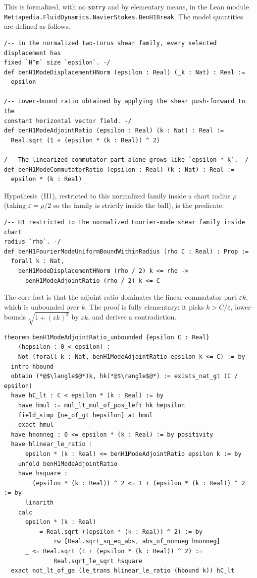 \documentclass[11pt]{article}
\theoremstyle{definition}
\begin{document}
This is formalized, with no \texttt{sorry} and by elementary means, in the Lean
module \texttt{Mettapedia.FluidDynamics.NavierStokes.BenH1Break}. The model
quantities are defined as follows.

\begin{lstlisting}[language={}]
/-- In the normalized two-torus shear family, every selected displacement has
fixed `H^m` size `epsilon`. -/
def benH1ModeDisplacementHNorm (epsilon : Real) (_k : Nat) : Real :=
  epsilon

/-- Lower-bound ratio obtained by applying the shear push-forward to the
constant horizontal vector field. -/
def benH1ModeAdjointRatio (epsilon : Real) (k : Nat) : Real :=
  Real.sqrt (1 + (epsilon * (k : Real)) ^ 2)

/-- The linearized commutator part alone grows like `epsilon * k`. -/
def benH1ModeCommutatorRatio (epsilon : Real) (k : Nat) : Real :=
  epsilon * (k : Real)
\end{lstlisting}

Hypothesis~(H1), restricted to this normalized family inside a chart radius
$\rho$ (taking $\varepsilon=\rho/2$ so the family is strictly inside the ball),
is the predicate:

\begin{lstlisting}[language={}]
/-- H1 restricted to the normalized Fourier-mode shear family inside chart
radius `rho`. -/
def benH1FourierModeUniformBoundWithinRadius (rho C : Real) : Prop :=
  forall k : Nat,
    benH1ModeDisplacementHNorm (rho / 2) k <= rho ->
      benH1ModeAdjointRatio (rho / 2) k <= C
\end{lstlisting}

The core fact is that the adjoint ratio dominates the linear commutator part
$\varepsilon k$, which is unbounded over $k$. The proof is fully elementary: it
picks $k>C/\varepsilon$, lower-bounds $\sqrt{1+(\varepsilon k)^2}$ by
$\varepsilon k$, and derives a contradiction.

\begin{lstlisting}[language={}]
theorem benH1ModeAdjointRatio_unbounded {epsilon C : Real}
    (hepsilon : 0 < epsilon) :
    Not (forall k : Nat, benH1ModeAdjointRatio epsilon k <= C) := by
  intro hbound
  obtain (*@$\langle$@*)k, hk(*@$\rangle$@*) := exists_nat_gt (C / epsilon)
  have hC_lt : C < epsilon * (k : Real) := by
    have hmul := mul_lt_mul_of_pos_left hk hepsilon
    field_simp [ne_of_gt hepsilon] at hmul
    exact hmul
  have hnonneg : 0 <= epsilon * (k : Real) := by positivity
  have hlinear_le_ratio :
      epsilon * (k : Real) <= benH1ModeAdjointRatio epsilon k := by
    unfold benH1ModeAdjointRatio
    have hsquare :
        (epsilon * (k : Real)) ^ 2 <= 1 + (epsilon * (k : Real)) ^ 2 := by
      linarith
    calc
      epsilon * (k : Real)
          = Real.sqrt ((epsilon * (k : Real)) ^ 2) := by
              rw [Real.sqrt_sq_eq_abs, abs_of_nonneg hnonneg]
      _ <= Real.sqrt (1 + (epsilon * (k : Real)) ^ 2) :=
              Real.sqrt_le_sqrt hsquare
  exact not_lt_of_ge (le_trans hlinear_le_ratio (hbound k)) hC_lt
\end{lstlisting}
\end{document}
